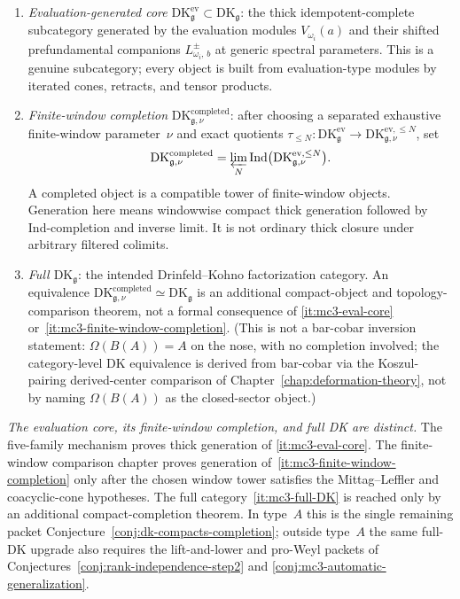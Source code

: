 \begin{enumerate}[label=\textup{(D\arabic*)},nosep]
\item\label{it:mc3-eval-core}
 \emph{Evaluation-generated core}
 $\mathrm{DK}^{\mathrm{ev}}_\mathfrak{g} \subset
 \mathrm{DK}_\mathfrak{g}$:
 the thick idempotent-complete subcategory generated by the
 evaluation modules $V_{\omega_i}(a)$ and their shifted
 prefundamental companions $L^{\pm}_{\omega_i,\,b}$
 at generic spectral parameters.
 This is a genuine subcategory; every object is built from
 evaluation-type modules by iterated cones, retracts, and tensor
 products.
\item\label{it:mc3-finite-window-completion}
 \emph{Finite-window completion}
 $\mathrm{DK}^{\mathrm{completed}}_{\mathfrak g,\nu}$:
 after choosing a separated exhaustive finite-window parameter~$\nu$
 and exact quotients
 $\tau_{\le N}\colon\mathrm{DK}^{\mathrm{ev}}_{\mathfrak g}
 \to\mathrm{DK}^{\mathrm{ev},\le N}_{\mathfrak g,\nu}$, set
 \[
  \mathrm{DK}^{\mathrm{completed}}_{\mathfrak g,\nu}
  =
  \varprojlim_N
  \operatorname{Ind}
  \bigl(\mathrm{DK}^{\mathrm{ev},\le N}_{\mathfrak g,\nu}\bigr).
 \]
 A completed object is a compatible tower of finite-window objects.
 Generation here means windowwise compact thick generation followed by
 Ind-completion and inverse limit.  It is not ordinary thick closure
 under arbitrary filtered colimits.
\item\label{it:mc3-full-DK}
 \emph{Full $\mathrm{DK}_\mathfrak{g}$}: the intended
 Drinfeld--Kohno factorization category.  An equivalence
 $\mathrm{DK}^{\mathrm{completed}}_{\mathfrak g,\nu}\simeq
 \mathrm{DK}_\mathfrak{g}$ is an additional compact-object and
 topology-comparison theorem, not a formal consequence of
 \ref{it:mc3-eval-core} or~\ref{it:mc3-finite-window-completion}.
 \textup{(}This is not a bar-cobar inversion statement:
 $\Omega(B(A)) = A$ on the nose, with no completion involved;
 the category-level DK equivalence is derived from bar-cobar
 via the Koszul-pairing derived-center comparison of
 Chapter~\ref{chap:deformation-theory}, not by naming
 $\Omega(B(A))$ as the closed-sector object.\textup{)}
\end{enumerate}

\begin{principle}
\label{princ:mc3-scope-distinction}
\emph{The evaluation core, its finite-window completion, and full DK
are distinct.} The five-family mechanism proves thick generation of
\ref{it:mc3-eval-core}. The finite-window comparison chapter proves
generation of~\ref{it:mc3-finite-window-completion} only after the
chosen window tower satisfies the Mittag--Leffler and coacyclic-cone
hypotheses. The full category~\ref{it:mc3-full-DK} is reached only by
an additional compact-completion theorem. In type~$A$ this is the
single remaining packet
Conjecture~\ref{conj:dk-compacts-completion}; outside type~$A$ the
same full-DK upgrade also requires the lift-and-lower and pro-Weyl
packets of Conjectures~\ref{conj:rank-independence-step2} and
\ref{conj:mc3-automatic-generalization}.
\end{principle}

